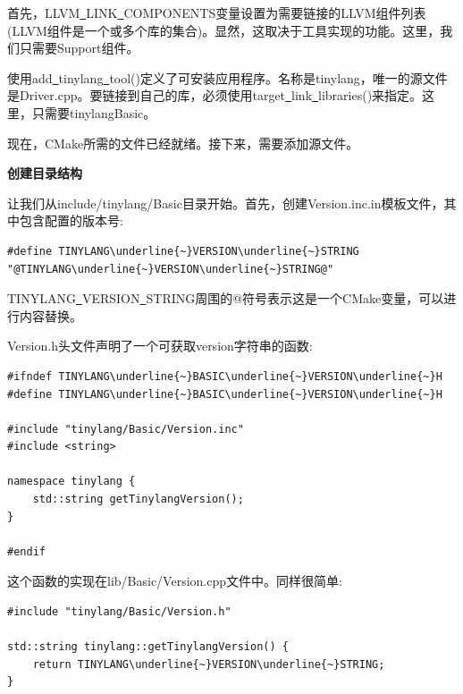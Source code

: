 首先，LLVM\underline{~}LINK\underline{~}COMPONENTS变量设置为需要链接的LLVM组件列表(LLVM组件是一个或多个库的集合)。显然，这取决于工具实现的功能。这里，我们只需要Support组件。\par

使用add\underline{~}tinylang\underline{~}tool()定义了可安装应用程序。名称是tinylang，唯一的源文件是Driver.cpp。要链接到自己的库，必须使用target\underline{~}link\underline{~}libraries()来指定。这里，只需要tinylangBasic。\par

现在，CMake所需的文件已经就绪。接下来，需要添加源文件。\par

\hspace*{\fill} \par %
\textbf{创建目录结构}

让我们从include/tinylang/Basic目录开始。首先，创建Version.inc.in模板文件，其中包含配置的版本号:\par

\begin{lstlisting}[caption={}]
#define TINYLANG\underline{~}VERSION\underline{~}STRING "@TINYLANG\underline{~}VERSION\underline{~}STRING@"
\end{lstlisting}

TINYLANG\underline{~}VERSION\underline{~}STRING周围的@符号表示这是一个CMake变量，可以进行内容替换。\par

Version.h头文件声明了一个可获取version字符串的函数:\par

\begin{lstlisting}[caption={}]
#ifndef TINYLANG\underline{~}BASIC\underline{~}VERSION\underline{~}H
#define TINYLANG\underline{~}BASIC\underline{~}VERSION\underline{~}H

#include "tinylang/Basic/Version.inc"
#include <string>

namespace tinylang {
	std::string getTinylangVersion();
}

#endif
\end{lstlisting}

这个函数的实现在lib/Basic/Version.cpp文件中。同样很简单:\par

\begin{lstlisting}[caption={}]
#include "tinylang/Basic/Version.h"

std::string tinylang::getTinylangVersion() {
	return TINYLANG\underline{~}VERSION\underline{~}STRING;
}
\end{lstlisting}

